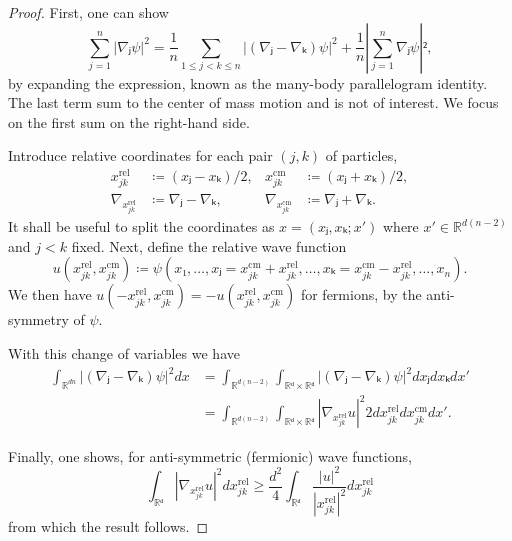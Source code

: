 \begin{proof}
  First, one can show
  \begin{equation}
    ∑_{j=1}^n |∇ⱼ ψ|^2 = \frac{1}{n} ∑_{1 \le j < k \le n} \left| (∇ⱼ - ∇ₖ) ψ \right|^2 + \frac{1}{n} \left| ∑_{j=1}^n ∇ⱼ ψ \right|²,
  \end{equation}
  by expanding the expression, known as the many-body parallelogram identity. The last term sum to the center of mass motion and is not of interest. We focus on the first sum on the right-hand side.

  Introduce relative coordinates for each pair $(j,k)$ of particles,
  \begin{equation}
    \begin{aligned}
      x_{jk}^\text{rel} &≔ (xⱼ - xₖ)/2, & x_{jk}^\text{cm} &≔ (xⱼ + xₖ)/2, \\
      ∇_{x_{jk}^\text{rel}} &≔ ∇ⱼ - ∇ₖ, & ∇_{x_{jk}^\text{cm}} &≔ ∇ⱼ + ∇ₖ.
    \end{aligned}
  \end{equation}
  It shall be useful to split the coordinates as $x = (xⱼ, xₖ; x')$ where $x' ∈ ℝ^{d(n-2)}$ and $j < k$ fixed. Next, define the relative wave function
  \begin{equation}
    u(x_{jk}^\text{rel}, x_{jk}^\text{cm}) ≔ ψ(x₁, …, xⱼ=x_{jk}^\text{cm}+x_{jk}^\text{rel}, …, xₖ = x_{jk}^\text{cm}-x_{jk}^\text{rel}, …, x_n).
  \end{equation}
  We then have $u(-x_{jk}^\text{rel}, x_{jk}^\text{cm}) = -u(x_{jk}^\text{rel}, x_{jk}^\text{cm})$ for fermions, by the anti-symmetry of $ψ$.

  With this change of variables we have
  \begin{equation}
    \begin{aligned}
      ∫_{ℝ^{dn}} \left|(∇ⱼ-∇ₖ)ψ\right|^2 dx
      &= ∫_{ℝ^{d(n-2)}} ∫_{ℝᵈ \times ℝᵈ} \left|(∇ⱼ-∇ₖ)ψ\right|^2 dxⱼdxₖdx' \\
      &= ∫_{ℝ^{d(n-2)}} ∫_{ℝᵈ \times ℝᵈ} \left|∇_{x_{jk}^\text{rel}}u\right|^2  2 dx_{jk}^\text{rel}dx_{jk}^\text{cm} dx'.
    \end{aligned}
  \end{equation}

  Finally, one shows, for anti-symmetric (fermionic) wave functions,
  \begin{equation}
    ∫_{ℝᵈ} \left|∇_{x_{jk}^\text{rel}} u \right|^2 dx_{jk}^\text{rel} \ge \frac{d^2}{4} ∫_{ℝᵈ} \frac{|u|^2}{|x_{jk}^\text{rel}|^2} dx_{jk}^\text{rel}
  \end{equation}
  from which the result follows.
\end{proof}


